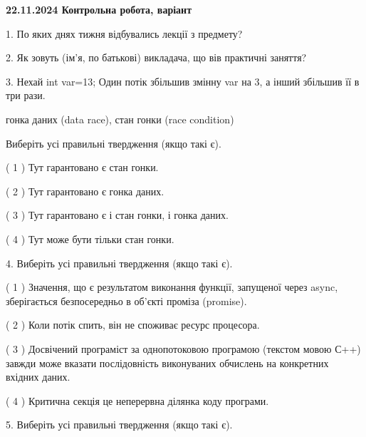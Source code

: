 \documentclass[12pt, ukrainian]{article}
\begin{document}
\vspace{4mm}
\newpage
\begin {large}

\textbf{22.11.2024 Контрольна робота, варіант  }\par


{
1. По яких днях тижня відбувались лекції з предмету?



\vspace{5mm}
2. Як зовуть (ім'я, по батькові) викладача, що вів практичні заняття?



\vspace{5mm}
3. Нехай int var=13; Один потік збільшив змінну var на 3, а інший збільшив її в три рази.

гонка даних (data race), стан гонки (race condition)

Виберіть усі правильні твердження (якщо такі є).\par
\vspace{2mm}
( 1 ) Тут гарантовано є стан гонки.%

( 2 ) Тут гарантовано є гонка даних.%

( 3 ) Тут гарантовано є і стан гонки, і гонка даних.%

( 4 ) Тут може бути тільки стан гонки.%


\vspace{5mm}
4. Виберіть усі правильні твердження (якщо такі є).\par
\vspace{2mm}

( 1 ) Значення, що є результатом виконання функції, запущеної через async, зберігається безпосередньо в об’єкті проміза (promise).%

( 2 ) Коли потік спить, він не споживає ресурс процесора.%

( 3 ) Досвічений програміст за однопотоковою програмою (текстом мовою С++) завжди може вказати послідовність виконуваних обчислень на конкретних вхідних даних.%

( 4 ) Критична секція це неперервна ділянка коду програми.%


\vspace{5mm}
5. Виберіть усі правильні твердження (якщо такі є).\par
\vspace{2mm}

}
\end{large}
\end{document}
